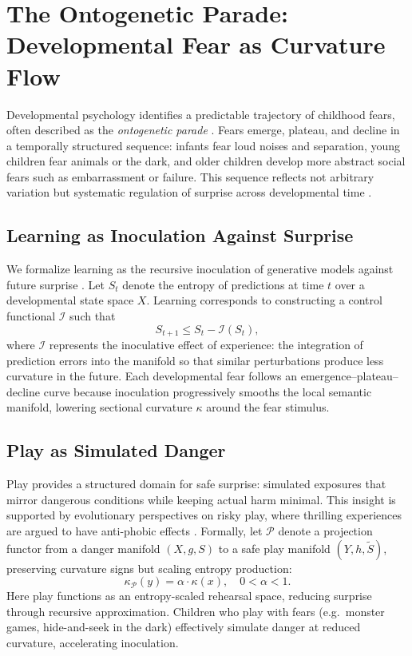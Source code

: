 \documentclass{article}
\theoremstyle{definition}
\begin{document}
\section{The Ontogenetic Parade: Developmental Fear as Curvature Flow}

Developmental psychology identifies a predictable trajectory of childhood fears,
often described as the \emph{ontogenetic parade} \cite{muris2002ontogeny,gullone2000developmental}.
Fears emerge, plateau, and decline in a temporally structured sequence: infants
fear loud noises and separation, young children fear animals or the dark, and
older children develop more abstract social fears such as embarrassment or
failure. This sequence reflects not arbitrary variation but systematic
regulation of surprise across developmental time \cite{field2001development}.

\subsection{Learning as Inoculation Against Surprise}

We formalize learning as the recursive inoculation of generative models against
future surprise \cite{muris2000development}. Let $S_t$ denote the entropy of
predictions at time $t$ over a developmental state space $X$. Learning
corresponds to constructing a control functional $\mathcal{I}$ such that
\[
S_{t+1} \leq S_t - \mathcal{I}(S_t),
\]
where $\mathcal{I}$ represents the inoculative effect of experience: the
integration of prediction errors into the manifold so that similar perturbations
produce less curvature in the future. Each developmental fear follows an
emergence--plateau--decline curve because inoculation progressively smooths the
local semantic manifold, lowering sectional curvature $\kappa$ around the fear
stimulus.

\subsection{Play as Simulated Danger}

Play provides a structured domain for safe surprise: simulated exposures that
mirror dangerous conditions while keeping actual harm minimal. This insight is
supported by evolutionary perspectives on risky play, where thrilling
experiences are argued to have anti-phobic effects
\cite{sandseter2011children}. Formally, let $\mathcal{P}$ denote a projection
functor from a danger manifold $(X, g, S)$ to a safe play manifold
$(Y, h, \tilde S)$, preserving curvature signs but scaling entropy production:
\[
\kappa_{\mathcal{P}}(y) = \alpha \cdot \kappa(x), \quad 0 < \alpha < 1.
\]
Here play functions as an entropy-scaled rehearsal space, reducing surprise
through recursive approximation. Children who play with fears (e.g.~monster
games, hide-and-seek in the dark) effectively simulate danger at reduced
curvature, accelerating inoculation.
\end{document}
